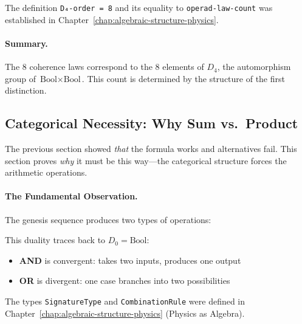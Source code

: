 \documentclass[11pt,a4paper]{book}
\begin{document}
The definition \verb|D₄-order = 8| and its equality to \verb|operad-law-count| 
was established in Chapter~\ref{chap:algebraic-structure-physics}.

\paragraph{Summary.}

The 8 coherence laws correspond to the 8 elements of $D_4$, the automorphism group of 
$\text{Bool} \times \text{Bool}$. This count is determined by the structure of the 
first distinction.

\subsection{Categorical Necessity: Why Sum vs.\ Product}
\label{sec:alpha-categorical-necessity}

The previous section showed \emph{that} the formula works and alternatives fail.
This section proves \emph{why} it must be this way---the categorical 
structure forces the arithmetic operations.

\paragraph{The Fundamental Observation.}

The genesis sequence produces two types of operations:

\begin{center}
\end{center}

This duality traces back to $D_0 = \text{Bool}$:

\begin{itemize}
\item \textbf{AND} is convergent: takes two inputs, produces one output
\item \textbf{OR} is divergent: one case branches into two possibilities
\end{itemize}

The types \verb|SignatureType| and \verb|CombinationRule| were defined in 
Chapter~\ref{chap:algebraic-structure-physics} (Physics as Algebra).
\end{document}
